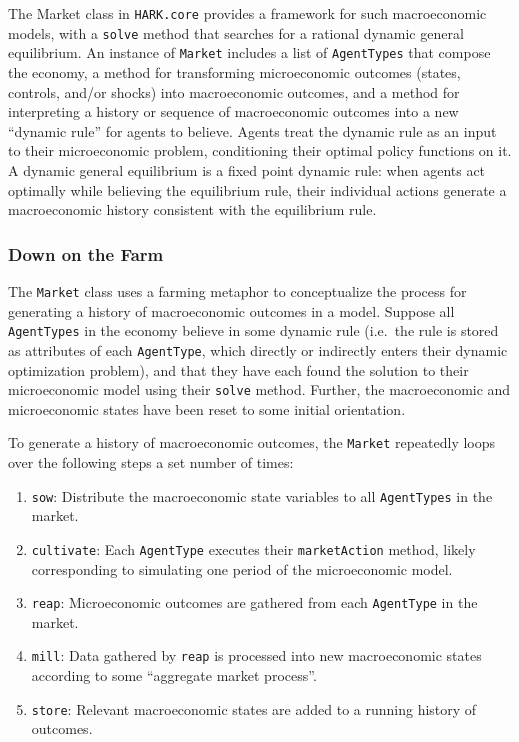 \documentclass[10pt,twocolumn]{article}
\providecommand{\tightlist}{%
  \setlength{\itemsep}{0pt}\setlength{\parskip}{0pt}}
\begin{document}
The Market class in \texttt{HARK.core} provides a framework for such
macroeconomic models, with a \texttt{solve} method that searches for a
rational dynamic general equilibrium. An instance of \texttt{Market}
includes a list of \texttt{AgentTypes} that compose the economy, a
method for transforming microeconomic outcomes (states, controls, and/or
shocks) into macroeconomic outcomes, and a method for interpreting a
history or sequence of macroeconomic outcomes into a new ``dynamic
rule'' for agents to believe. Agents treat the dynamic rule as an input
to their microeconomic problem, conditioning their optimal policy
functions on it. A dynamic general equilibrium is a fixed point dynamic
rule: when agents act optimally while believing the equilibrium rule,
their individual actions generate a macroeconomic history consistent
with the equilibrium rule.

\subsubsection{Down on the Farm}\label{down-on-the-farm}

The \texttt{Market} class uses a farming metaphor to conceptualize the
process for generating a history of macroeconomic outcomes in a model.
Suppose all \texttt{AgentTypes} in the economy believe in some dynamic
rule (i.e.~the rule is stored as attributes of each \texttt{AgentType},
which directly or indirectly enters their dynamic optimization problem),
and that they have each found the solution to their microeconomic model
using their \texttt{solve} method. Further, the macroeconomic and
microeconomic states have been reset to some initial orientation.

To generate a history of macroeconomic outcomes, the \texttt{Market}
repeatedly loops over the following steps a set number of times:

\begin{enumerate}
\def\labelenumi{\arabic{enumi}.}
\tightlist
\item
  \texttt{sow}: Distribute the macroeconomic state variables to all
  \texttt{AgentTypes} in the market.
\item
  \texttt{cultivate}: Each \texttt{AgentType} executes their
  \texttt{marketAction} method, likely corresponding to simulating one
  period of the microeconomic model.
\item
  \texttt{reap}: Microeconomic outcomes are gathered from each
  \texttt{AgentType} in the market.
\item
  \texttt{mill}: Data gathered by \texttt{reap} is processed into new
  macroeconomic states according to some ``aggregate market process''.
\item
  \texttt{store}: Relevant macroeconomic states are added to a running
  history of outcomes.
\end{enumerate}
\end{document}
